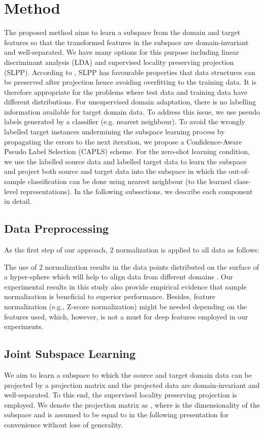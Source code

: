 \documentclass[conference]{IEEEtran}
\begin{document}
\section{Method}\label{sec:method}
The proposed method aims to learn a subspace from the domain and target features so that the transformed features in the subspace are domain-invariant and well-separated. We have many options for this purpose including linear discriminant analysis (LDA) and supervised locality preserving projection (SLPP). According to \cite{wang2017zero}, SLPP has favourable properties that data structures can be preserved after projection hence avoiding overfitting to the training data. It is therefore appropriate for the problems where test data and training data have different distributions. For unsupervised domain adaptation, there is no labelling information available for target domain data. To address this issue, we use pseudo labels generated by a classifier (e.g. nearest neighbour). To avoid the wrongly labelled target instances undermining the subspace learning process by propagating the errors to the next iteration, we propose a Confidence-Aware Pseudo Label Selection (CAPLS) scheme. For the zero-shot learning condition, we use the labelled source data and labelled target data to learn the subspace and project both source and target data into the subspace in which the out-of-sample classification can be done using nearest neighbour (to the learned class-level representations). In the following subsections, we describe each component in detail.
\subsection{Data Preprocessing}\label{sec:method_pre}
As the first step of our approach, 2 normalization is applied to all data as follows:

The use of 2 normalization results in the data points distributed on the surface of a hyper-sphere which will help to align data from different domains \cite{wang2017zero}. Our experimental results in this study also provide empirical evidence that sample normalization is beneficial to superior performance. Besides, feature normalization (e.g., Z-score normalization) might be needed depending on the features used, which, however, is not a must for deep features employed in our experiments.
\subsection{Joint Subspace Learning}\label{sec:method_jsl}
We aim to learn a subspace to which the source and target domain data can be projected by a projection matrix and the projected data are domain-invariant and well-separated. To this end, the supervised locality preserving projection \cite{wang2017zero} is employed.
We denote the projection matrix as , where  is the dimensionality of the subspace and  is assumed to be equal to  in the following presentation for convenience without loss of generality. 
\end{document}
